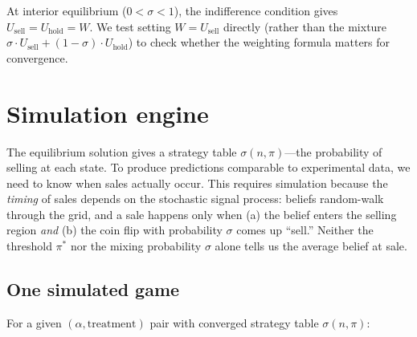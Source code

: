 \documentclass[11pt]{article}
\begin{document}
At interior equilibrium ($0 < \sigma < 1$), the indifference condition gives
$U_{\text{sell}} = U_{\text{hold}} = W$. We test setting
$W = U_{\text{sell}}$ directly (rather than the mixture
$\sigma \cdot U_{\text{sell}} + (1-\sigma) \cdot U_{\text{hold}}$) to check
whether the weighting formula matters for convergence.

\section{Simulation engine}\label{sec:simulation}

The equilibrium solution gives a strategy table $\sigma(n, \pi)$---the
probability of selling at each state. To produce predictions comparable to
experimental data, we need to know when sales actually occur. This requires
simulation because the \textit{timing} of sales depends on the stochastic
signal process: beliefs random-walk through the grid, and a sale happens only
when (a) the belief enters the selling region \textit{and} (b) the coin flip
with probability $\sigma$ comes up ``sell.'' Neither the threshold $\pi^*$ nor
the mixing probability $\sigma$ alone tells us the average belief at sale.

\subsection{One simulated game}

For a given $(\alpha, \text{treatment})$ pair with converged strategy table
$\sigma(n, \pi)$:
\end{document}

